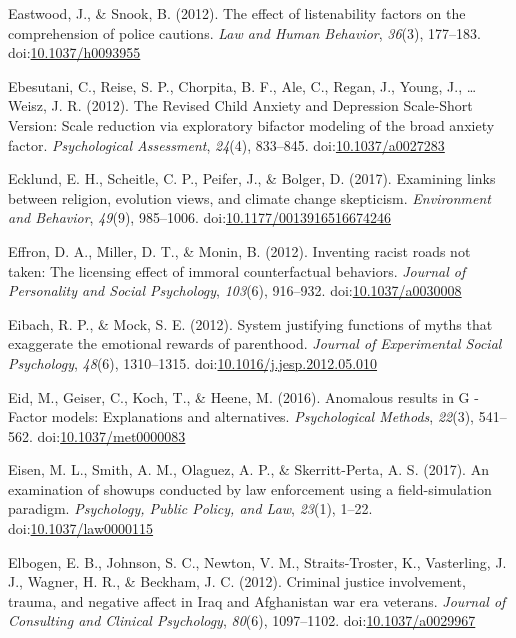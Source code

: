 \documentclass[english,man]{apa6}
\theoremstyle{definition}
\theoremstyle{definition}
\theoremstyle{definition}
\theoremstyle{remark}
\begin{document}
\hypertarget{ref-Eastwood2011}{}
Eastwood, J., \& Snook, B. (2012). The effect of listenability factors
on the comprehension of police cautions. \emph{Law and Human Behavior},
\emph{36}(3), 177--183.
doi:\href{https://doi.org/10.1037/h0093955}{10.1037/h0093955}

\hypertarget{ref-Ebesutani2012}{}
Ebesutani, C., Reise, S. P., Chorpita, B. F., Ale, C., Regan, J., Young,
J., \ldots{} Weisz, J. R. (2012). The Revised Child Anxiety and
Depression Scale-Short Version: Scale reduction via exploratory bifactor
modeling of the broad anxiety factor. \emph{Psychological Assessment},
\emph{24}(4), 833--845.
doi:\href{https://doi.org/10.1037/a0027283}{10.1037/a0027283}

\hypertarget{ref-Ecklund2017}{}
Ecklund, E. H., Scheitle, C. P., Peifer, J., \& Bolger, D. (2017).
Examining links between religion, evolution views, and climate change
skepticism. \emph{Environment and Behavior}, \emph{49}(9), 985--1006.
doi:\href{https://doi.org/10.1177/0013916516674246}{10.1177/0013916516674246}

\hypertarget{ref-Effron2012}{}
Effron, D. A., Miller, D. T., \& Monin, B. (2012). Inventing racist
roads not taken: The licensing effect of immoral counterfactual
behaviors. \emph{Journal of Personality and Social Psychology},
\emph{103}(6), 916--932.
doi:\href{https://doi.org/10.1037/a0030008}{10.1037/a0030008}

\hypertarget{ref-Eibach2012}{}
Eibach, R. P., \& Mock, S. E. (2012). System justifying functions of
myths that exaggerate the emotional rewards of parenthood. \emph{Journal
of Experimental Social Psychology}, \emph{48}(6), 1310--1315.
doi:\href{https://doi.org/10.1016/j.jesp.2012.05.010}{10.1016/j.jesp.2012.05.010}

\hypertarget{ref-Eid2016}{}
Eid, M., Geiser, C., Koch, T., \& Heene, M. (2016). Anomalous results in
G -Factor models: Explanations and alternatives. \emph{Psychological
Methods}, \emph{22}(3), 541--562.
doi:\href{https://doi.org/10.1037/met0000083}{10.1037/met0000083}

\hypertarget{ref-Eisen2017}{}
Eisen, M. L., Smith, A. M., Olaguez, A. P., \& Skerritt-Perta, A. S.
(2017). An examination of showups conducted by law enforcement using a
field-simulation paradigm. \emph{Psychology, Public Policy, and Law},
\emph{23}(1), 1--22.
doi:\href{https://doi.org/10.1037/law0000115}{10.1037/law0000115}

\hypertarget{ref-Elbogen2012}{}
Elbogen, E. B., Johnson, S. C., Newton, V. M., Straits-Troster, K.,
Vasterling, J. J., Wagner, H. R., \& Beckham, J. C. (2012). Criminal
justice involvement, trauma, and negative affect in Iraq and Afghanistan
war era veterans. \emph{Journal of Consulting and Clinical Psychology},
\emph{80}(6), 1097--1102.
doi:\href{https://doi.org/10.1037/a0029967}{10.1037/a0029967}
\end{document}

